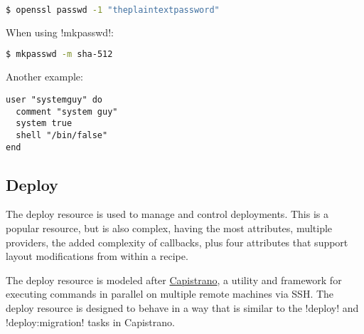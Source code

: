 \begin{lstlisting}[language=Bash,label=lst:cookbook-resources-cookbook-user2]
$ openssl passwd -1 "theplaintextpassword"
\end{lstlisting}

When using \inline!mkpasswd!:

\begin{lstlisting}[language=Bash,label=lst:cookbook-resources-cookbook-user3]
$ mkpasswd -m sha-512
\end{lstlisting}

Another example:

\begin{lstlisting}[label=lst:cookbook-resources-cookbook-user4]
user "systemguy" do
  comment "system guy"
  system true
  shell "/bin/false"
end
\end{lstlisting}

\subsection{Deploy}

The deploy resource is used to manage and control deployments. This is a popular resource, but is also complex, having the most attributes, multiple providers, the added complexity of callbacks, plus four attributes that support layout modifications from within a recipe.

The deploy resource is modeled after \href{http://capistranorb.com/}{Capistrano}, a utility and framework for executing commands in parallel on multiple remote machines via SSH. The deploy resource is designed to behave in a way that is similar to the \inline!deploy! and \inline!deploy:migration! tasks in Capistrano.